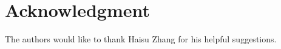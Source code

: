 \documentclass[conference]{IEEEtran}
\begin{document}


\section*{Acknowledgment}

The authors would like to thank Haisu Zhang for his helpful suggestions.




%
%
%









\end{document}
